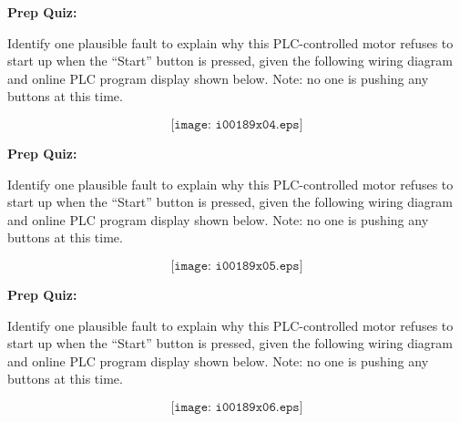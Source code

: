 \vfil \eject

\noindent
{\bf Prep Quiz:}

Identify one plausible fault to explain why this PLC-controlled motor refuses to start up when the ``Start'' button is pressed, given the following wiring diagram and online PLC program display shown below.  Note: no one is pushing any buttons at this time.

$$\texttt{[image: i00189x04.eps]}$$






\vfil \eject

\noindent
{\bf Prep Quiz:}

Identify one plausible fault to explain why this PLC-controlled motor refuses to start up when the ``Start'' button is pressed, given the following wiring diagram and online PLC program display shown below.  Note: no one is pushing any buttons at this time.

$$\texttt{[image: i00189x05.eps]}$$






\vfil \eject

\noindent
{\bf Prep Quiz:}

Identify one plausible fault to explain why this PLC-controlled motor refuses to start up when the ``Start'' button is pressed, given the following wiring diagram and online PLC program display shown below.  Note: no one is pushing any buttons at this time.

$$\texttt{[image: i00189x06.eps]}$$





